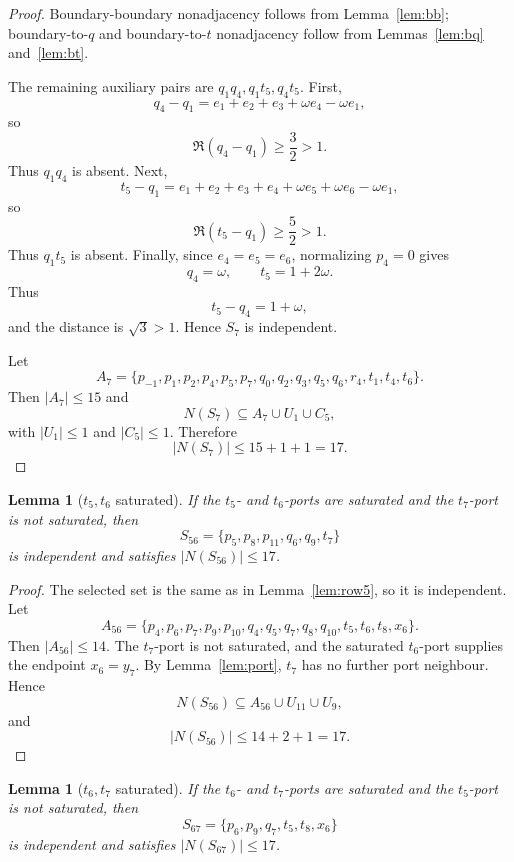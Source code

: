 \documentclass[11pt]{article}
\newtheorem{lemma}[theorem]{Lemma}
\begin{document}
\begin{proof}
Boundary-boundary nonadjacency follows from Lemma~\ref{lem:bb}; boundary-to-$q$ and boundary-to-$t$ nonadjacency follow from Lemmas~\ref{lem:bq} and~\ref{lem:bt}.

The remaining auxiliary pairs are $q_1q_4,q_1t_5,q_4t_5$. First,
\[
 q_4-q_1=e_1+e_2+e_3+\omega e_4-\omega e_1,
\]
so
\[
 \Re(q_4-q_1)\ge\frac32>1.
\]
Thus $q_1q_4$ is absent. Next,
\[
 t_5-q_1=e_1+e_2+e_3+e_4+\omega e_5+\omega e_6-\omega e_1,
\]
so
\[
 \Re(t_5-q_1)\ge\frac52>1.
\]
Thus $q_1t_5$ is absent. Finally, since $e_4=e_5=e_6$, normalizing $p_4=0$ gives
\[
 q_4=\omega,
 \qquad
 t_5=1+2\omega.
\]
Thus
\[
 t_5-q_4=1+\omega,
\]
and the distance is $\sqrt3>1$. Hence $S_7$ is independent.

Let
\[
A_7=\{p_{-1},p_1,p_2,p_4,p_5,p_7,q_0,q_2,q_3,q_5,q_6,r_4,t_1,t_4,t_6\}.
\]
Then $|A_7|\le15$ and
\[
 N(S_7)\subseteq A_7\cup U_1\cup C_5,
\]
with $|U_1|\le1$ and $|C_5|\le1$. Therefore
\[
 |N(S_7)|\le15+1+1=17.
\]
\end{proof}

\begin{lemma}[$t_5,t_6$ saturated]\label{lem:row56}
If the $t_5$- and $t_6$-ports are saturated and the $t_7$-port is not saturated, then
\[
 S_{56}=\{p_5,p_8,p_{11},q_6,q_9,t_7\}
\]
is independent and satisfies $|N(S_{56})|\le17$.
\end{lemma}

\begin{proof}
The selected set is the same as in Lemma~\ref{lem:row5}, so it is independent. Let
\[
 A_{56}=\{p_4,p_6,p_7,p_9,p_{10},q_4,q_5,q_7,q_8,q_{10},t_5,t_6,t_8,x_6\}.
\]
Then $|A_{56}|\le14$. The $t_7$-port is not saturated, and the saturated $t_6$-port supplies the endpoint $x_6=y_7$. By Lemma~\ref{lem:port}, $t_7$ has no further port neighbour. Hence
\[
 N(S_{56})\subseteq A_{56}\cup U_{11}\cup U_9,
\]
and
\[
 |N(S_{56})|\le14+2+1=17.
\]
\end{proof}

\begin{lemma}[$t_6,t_7$ saturated]\label{lem:row67}
If the $t_6$- and $t_7$-ports are saturated and the $t_5$-port is not saturated, then
\[
 S_{67}=\{p_6,p_9,q_7,t_5,t_8,x_6\}
\]
is independent and satisfies $|N(S_{67})|\le17$.
\end{lemma}
\end{document}
